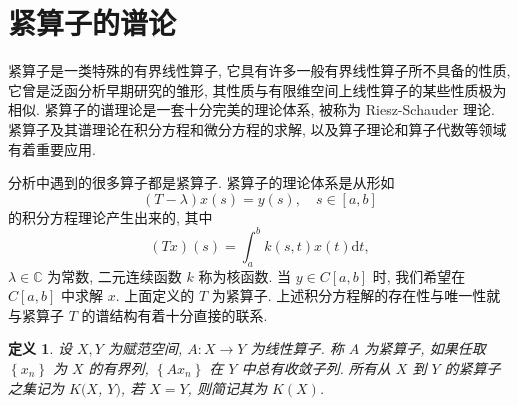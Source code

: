 \documentclass[openany]{ctexbook}
\theoremstyle{kaiti}
\newtheorem{definition}{定义}[section]
\theoremstyle{normal}
\begin{document}
\section{紧算子的谱论}

紧算子是一类特殊的有界线性算子, 它具有许多一般有界线性算子所不具备的性质, 它曾是泛函分析早期研究的雏形, 其性质与有限维空间上线性算子的某些性质极为相似. 紧算子的谱理论是一套十分完美的理论体系, 被称为 Riesz-Schauder 理论. 紧算子及其谱理论在积分方程和微分方程的求解, 以及算子理论和算子代数等领域有着重要应用.

分析中遇到的很多算子都是紧算子. 紧算子的理论体系是从形如
$$
(T-\lambda) x(s)=y(s), \quad s \in[a, b]
$$
的积分方程理论产生出来的, 其中
$$
(T x)(s)=\int_{a}^{b} k(s, t) x(t) \mathrm{d} t,
$$
$\lambda \in \mathbb{C}$ 为常数, 二元连续函数 $k$ 称为核函数. 当 $y \in C[a, b]$ 时, 我们希望在 $C[a, b]$ 中求解 $x$. 上面定义的 $T$ 为紧算子. 上述积分方程解的存在性与唯一性就与紧算子 $T$ 的谱结构有着十分直接的联系.

\begin{definition}
设 $X, Y$ 为赋范空间, $A: X \rightarrow Y$ 为线性算子. 称 $A$ 为紧算子, 如果任取 $\left\{x_n\right\}$ 为 $X$ 的有界列, $\left\{A x_n\right\}$ 在 $Y$ 中总有收敛子列. 所有从 $X$ 到 $Y$ 的紧算子之集记为 $K(X$, $Y)$, 若 $X=Y$, 则简记其为 $K(X)$.
\end{definition}
\end{document}
